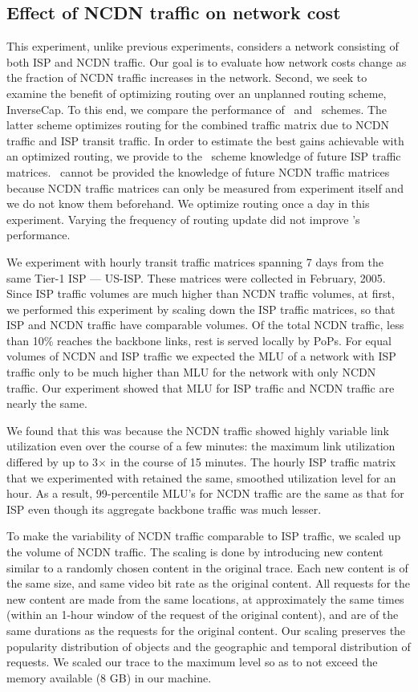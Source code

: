 \subsection{Effect of NCDN traffic on network cost}
This experiment, unlike previous experiments, considers a network consisting of both ISP and NCDN traffic. Our goal is to evaluate how network costs change as the fraction of NCDN traffic increases in the network. Second, we seek to examine the benefit of optimizing routing over an unplanned routing scheme, InverseCap. To this end, we compare the performance of \invlru\ and \optlru\ schemes. The latter scheme optimizes routing for the combined traffic matrix due to NCDN traffic and ISP transit traffic. 
In order to estimate the best gains achievable with an optimized routing, we provide to the \optlru\ scheme knowledge of future ISP traffic matrices. \optlru\ cannot be provided the knowledge of future NCDN traffic matrices because NCDN traffic matrices can only be measured from experiment itself and we do not know them beforehand. We optimize routing once a day in this experiment. Varying the frequency of routing update did not improve \optlru's performance.



We experiment with  hourly transit traffic matrices spanning 7 days from the same Tier-1 ISP --- US-ISP. These matrices were collected in February, 2005.
 Since ISP traffic volumes are much higher than NCDN traffic volumes, at first, we performed this experiment by scaling down the ISP traffic matrices, so that ISP and NCDN traffic have comparable volumes. Of the total NCDN traffic, less than 10\%  reaches the backbone links, rest is served locally by PoPs. 
For equal volumes of NCDN and ISP traffic we expected the MLU of a network  with ISP traffic only to be much higher than MLU for the network with only NCDN traffic. 
Our experiment showed that MLU for ISP traffic and NCDN traffic are nearly the same.

We found that this was because the NCDN traffic showed highly variable link utilization even over the course of a few minutes: the maximum link utilization differed by up to 3$\times$  in the course of 15 minutes. The hourly ISP traffic matrix that we experimented with  retained the same, smoothed utilization level for an hour.  As a result, 99-percentile MLU's for NCDN traffic are the same as that for ISP even though its aggregate backbone traffic was much lesser.


To make the variability of NCDN traffic comparable to ISP traffic, we scaled up the volume of NCDN traffic. The scaling is done by introducing new content similar to a randomly chosen content in the original trace. 
Each new content is of the same size, and same video bit rate  as the original content. All requests for the new content are made from the same locations, at approximately the same times (within an 1-hour window of the request of the original content),  and are of the same durations as the requests for the original content. Our scaling preserves the popularity distribution of objects and the geographic and temporal distribution of requests. We scaled our trace to the maximum level so as to not exceed the memory available (8 GB) in our machine.


